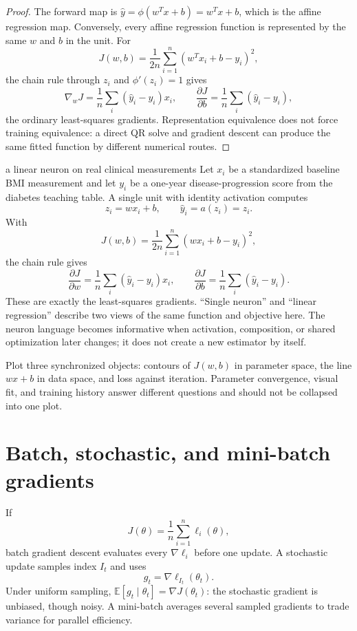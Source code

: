 \begin{proof}
The forward map is
$\widehat y=\phi(w^Tx+b)=w^Tx+b$, which is the affine regression map. Conversely,
every affine regression function is represented by the same $w$ and $b$ in the
unit. For
\[
J(w,b)=\frac{1}{2n}\sum_{i=1}^n(w^Tx_i+b-y_i)^2,
\]
the chain rule through $z_i$ and $\phi'(z_i)=1$ gives
\[
\nabla_wJ=\frac1n\sum_i(\widehat y_i-y_i)x_i,
\qquad
\frac{\partial J}{\partial b}=\frac1n\sum_i(\widehat y_i-y_i),
\]
the ordinary least-squares gradients. Representation equivalence does not
force training equivalence: a direct QR solve and gradient descent can produce
the same fitted function by different numerical routes.
\end{proof}

\begin{workedexample}{a linear neuron on real clinical measurements}
Let $x_i$ be a standardized baseline BMI measurement and let $y_i$ be a
one-year disease-progression score from the diabetes teaching table. A single
unit with identity activation computes
\[
z_i=wx_i+b,\qquad \widehat y_i=a(z_i)=z_i.
\]
With
\[
J(w,b)=\frac{1}{2n}\sum_{i=1}^n( wx_i+b-y_i)^2,
\]
the chain rule gives
\[
\frac{\partial J}{\partial w}
=\frac1n\sum_i(\widehat y_i-y_i)x_i,
\qquad
\frac{\partial J}{\partial b}
=\frac1n\sum_i(\widehat y_i-y_i).
\]
These are exactly the least-squares gradients. ``Single neuron'' and ``linear
regression'' describe two views of the same function and objective here. The
neuron language becomes informative when activation, composition, or shared
optimization later changes; it does not create a new estimator by itself.

Plot three synchronized objects: contours of $J(w,b)$ in parameter space, the
line $wx+b$ in data space, and loss against iteration. Parameter convergence,
visual fit, and training history answer different questions and should not be
collapsed into one plot.
\end{workedexample}

\section{Batch, stochastic, and mini-batch gradients}

If
\[
J(\theta)=\frac1n\sum_{i=1}^n\ell_i(\theta),
\]
batch gradient descent evaluates every $\nabla\ell_i$ before one update. A
stochastic update samples index $I_t$ and uses
\[
g_t=\nabla\ell_{I_t}(\theta_t).
\]
Under uniform sampling,
$\mathbb{E}[g_t\mid\theta_t]=\nabla J(\theta_t)$: the stochastic gradient is
unbiased, though noisy. A mini-batch averages several sampled gradients to
trade variance for parallel efficiency.

